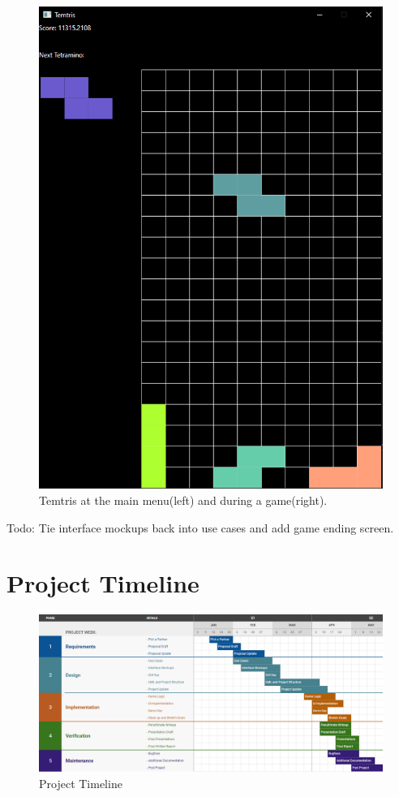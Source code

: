\documentclass[10pt,conference,onecolumn,compsoc]{IEEEtran}
\begin{document}
\begin{figure}[h!]
\includegraphics[scale=0.3]{GameRunning.png}
\caption{Temtris at the main menu(left) and during a game(right).}
\end{figure}

Todo: Tie interface mockups back into use cases and add game ending screen.

\section{Project Timeline}
\begin{figure}[h!]
\includegraphics[scale=.45]{Timeline.png}
\caption{Project Timeline}
\end{figure}
\end{document}
